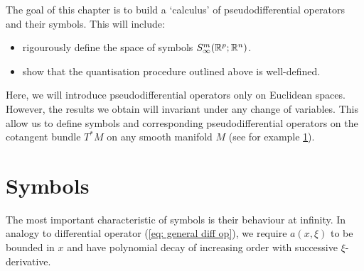 \documentclass[12pt]{article}
\begin{document}
The goal of this chapter is to build a `calculus' of pseudodifferential operators and their symbols. This will include: 
\begin{itemize}
    \item rigourously define the space of symbols $S^{m}_{\infty}({\mathbb R}^{p}; {\mathbb R}^{n})$. 
    \item show that the quantisation procedure outlined above is well-defined. 
\end{itemize} 

Here, we will introduce pseudodifferential operators only on Euclidean spaces. However, the results we obtain will invariant under any change of variables. This allow us to define symbols and corresponding pseudodifferential operators on the cotangent bundle $T^*M$ on any smooth manifold $M$ (see for example \ref{}). 


\section{Symbols}
The most important characteristic of symbols is their behaviour at infinity. In analogy to differential operator (\ref{eq: general diff op}), we require $a(x, \xi)$ to be bounded in $x$ and have polynomial decay of increasing order with successive $\xi$-derivative.  

\end{document}
